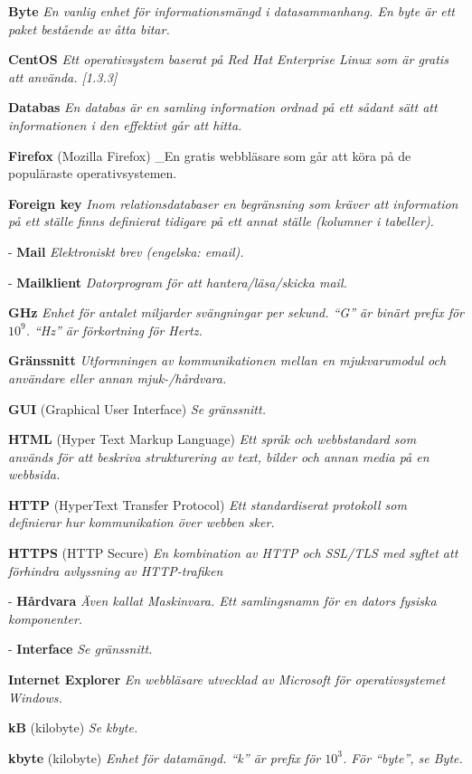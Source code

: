 \documentclass[a4paper, twoside, 11pt, titlepage]{article}
\begin{document}
\textbf{Byte} \emph{En vanlig enhet för informationsmängd i datasammanhang. En byte är ett paket bestående av åtta bitar.}

\textbf{CentOS} \emph{Ett operativsystem baserat på Red Hat Enterprise Linux som är gratis att använda. [1.3.3]}

\textbf{Databas} \emph{En databas är en samling information ordnad på ett sådant sätt att informationen i den effektivt går att hitta.}

\textbf{Firefox} (Mozilla Firefox) \_En gratis webbläsare som går att köra på de populäraste operativsystemen.

\textbf{Foreign key} \emph{Inom relationsdatabaser en begränsning som kräver att information på ett ställe finns definierat tidigare på ett annat ställe (kolumner i tabeller).}

- \textbf{Mail} \emph{Elektroniskt brev (engelska: email).}

- \textbf{Mailklient} \emph{Datorprogram för att hantera/läsa/skicka mail.}

\textbf{GHz} \emph{Enhet för antalet miljarder svängningar per sekund. ``G'' är binärt prefix för $10^{9}$. ``Hz'' är förkortning för Hertz.}

\textbf{Gränssnitt} \emph{Utformningen av kommunikationen mellan en mjukvarumodul och användare eller annan mjuk-/hårdvara.}

\textbf{GUI} (Graphical User Interface) \emph{Se gränssnitt.}

\textbf{HTML} (Hyper Text Markup Language) \emph{Ett språk och webbstandard som används för att beskriva strukturering av text, bilder och annan media på en webbsida.}

\textbf{HTTP} (HyperText Transfer Protocol) \emph{Ett standardiserat protokoll som definierar hur kommunikation över webben sker.}

\textbf{HTTPS} (HTTP Secure) \emph{En kombination av HTTP och SSL/TLS med syftet att förhindra avlyssning av HTTP-trafiken}

- \textbf{Hårdvara} \emph{Även kallat Maskinvara. Ett samlingsnamn för en dators fysiska komponenter.}

- \textbf{Interface} \emph{Se gränssnitt.}

\textbf{Internet Explorer} \emph{En webbläsare utvecklad av Microsoft för operativsystemet Windows.}

\textbf{kB} (kilobyte) \emph{Se kbyte.}

\textbf{kbyte} (kilobyte) \emph{Enhet för datamängd. ``k'' är prefix för $10^{3}$. För ``byte'', se Byte.}
\end{document}

